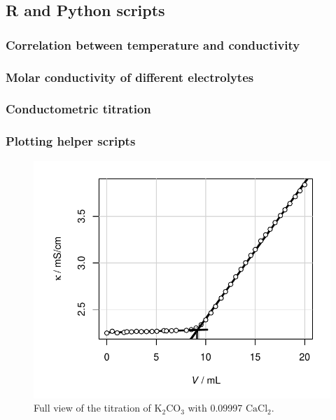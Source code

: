 \subsection{R and Python scripts} \label{r_scripts}

\subsubsection{Correlation between temperature and conductivity}

\newpage
\subsubsection{Molar conductivity of different electrolytes}

\newpage
\subsubsection{Conductometric titration}

\newpage
\subsubsection{Plotting helper scripts}

\begin{figure}[H]
    \centering
    \includegraphics[width=.9\textwidth]{figures/plots/lfk_titration_full.pdf}
    \caption{Full view of the titration of $\mathrm{K_{2}CO_{3}}$ with \qty[round-precision=5]{0.09997}{\M} $\mathrm{CaCl_2}$.}
    \label{fig:lfk_titr_full}
\end{figure}

